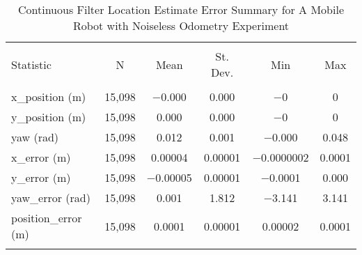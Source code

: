 
\begin{table}[htbp] \centering 
  \caption{Continuous Filter Location Estimate Error Summary for A Mobile Robot with Noiseless Odometry Experiment} 
  \label{tab:one_mobile_noiseless_no_gps_continuous_summary} 
\begin{tabular}{@{\extracolsep{5pt}}lccccc} 
\\[-1.8ex]\hline 
\hline \\[-1.8ex] 
Statistic & \multicolumn{1}{c}{N} & \multicolumn{1}{c}{Mean} & \multicolumn{1}{c}{St. Dev.} & \multicolumn{1}{c}{Min} & \multicolumn{1}{c}{Max} \\ 
\hline \\[-1.8ex] 
x\_position (m) & 15,098 & \num{-0.000} & \num{0.000} & $-$0 & 0 \\ 
y\_position (m) & 15,098 & \num{0.000} & \num{0.000} & $-$0 & 0 \\ 
yaw (rad) & 15,098 & \num{0.012} & \num{0.001} & \num{-0.000} & \num{0.048} \\ 
x\_error (m) & 15,098 & \num{0.00004} & \num{0.00001} & \num{-0.0000002} & \num{0.0001} \\ 
y\_error (m) & 15,098 & \num{-0.00005} & \num{0.00001} & \num{-0.0001} & \num{0.000} \\
yaw\_error (rad) & 15,098 & \num{0.001} & \num{1.812} & \num{-3.141} & \num{3.141} \\
position\_error (m) & 15,098 & \num{0.0001} & \num{0.00001} & \num{0.00002} & \num{0.0001} \\ 
\hline \\[-1.8ex] 
\end{tabular} 
\end{table} 
